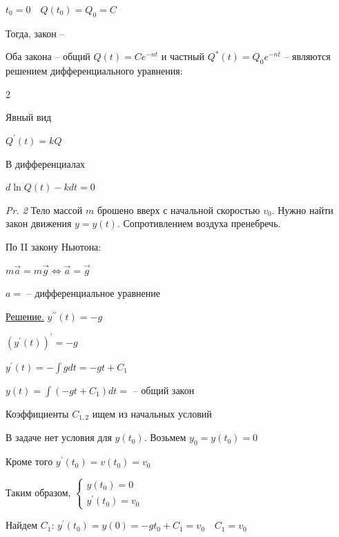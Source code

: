 \documentclass[12pt]{article}
\begin{document}
    $t_0 = 0 \quad Q(t_0) = Q_0 = C$

    Тогда, закон -- 

    \Nota Оба закона -- общий $Q(t) = Ce^{-nt}$ и частный $Q^*(t) = Q_0 e^{-nt}$ --
    являются решением дифференциального уравнения:

    \begin{multicols}{2}
        \begin{center}
        Явный вид

        $Q^\prime(t) = kQ$

        В дифференциалах

        $d \ln Q(t) - kdt = 0$
        \end{center}
    \end{multicols}

    \vspace{5mm}

    \hypertarget{freefallingbodyproblem}{}

    \begin{tcolorbox}
        \textit{Pr. 2} \quad Тело массой $m$ брошено вверх с начальной скоростью $v_0$. Нужно найти закон движения $y = y(t)$.
        Сопротивлением воздуха пренебречь.
    \end{tcolorbox}

    По II закону Ньютона:

    $m\vec{a} = m\vec{g} \Longleftrightarrow \vec{a} = \vec{g}$

    $a = $ -- дифференциальное уравнение

    \underline{Решение.} \quad $y^{\prime\prime}(t) = -g$

    $(y^{\prime}(t))^\prime = -g$

    $y^{\prime}(t) = -\int g dt = -gt + C_1$

    $y(t) = \int (-gt + C_1) dt = $ -- общий закон

    Коэффициенты $C_{1,2}$ ищем из начальных условий

    В задаче нет условия для $y(t_0)$. Возьмем $y_0 = y(t_0) = 0$

    Кроме того $y^\prime(t_0) = v(t_0) = v_0$

    Таким образом, $\begin{cases}y(t_0) = 0 \\ y^\prime(t_0) = v_0\end{cases}$

    Найдем $C_1$: $y^\prime(t_0) = y(0) = -gt_0 + C_1 = v_0 \quad C_1 = v_0$
\end{document}
